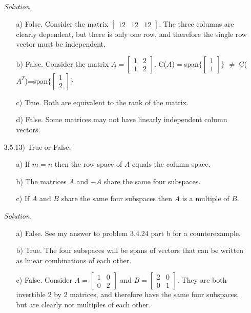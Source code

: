 \documentclass[12pt]{article}
\begin{document}
\begin{itemize}
\textit{Solution.}
\begin{itemize}
\item[a)] False. Consider the matrix $\left[\begin{array}{ccc} 12 & 12 & 12 \end{array}\right]$. The three columns are clearly dependent, but there is only one row, and therefore the single row vector must be independent.
\item[b)] False. Consider the matrix $A=\left[\begin{array}{cc} 1 & 2 \\ 1 & 2\end{array}\right]$. C($A$)$=$span$\{\left[\begin{array}{c} 1 \\ 1\end{array}\right]\}$ $\neq$ 
C($A^T$)=span$\{\left[\begin{array}{c} 1 \\ 2\end{array}\right]\}$
\item[c)] True. Both are equivalent to the rank of the matrix.
\item[d)] False. Some matrices may not have linearly independent column vectors.
\end{itemize}

\item[3.5.13)] True or False:
\begin{itemize}
\item[a)] If $m=n$ then the row space of $A$ equals the column space.
\item[b)] The matrices $A$ and $-A$ share the same four subspaces.
\item[c)] If $A$ and $B$ share the same four subspaces then $A$ is a multiple of $B$.
\end{itemize}

\textit{Solution.}
\begin{itemize}
\item[a)] False. See my answer to problem 3.4.24 part b for a counterexample.
\item[b)] True. The four subspaces will be spans of vectors that can be written as linear combinations of each other.
\item[c)] False. Consider $A=\left[\begin{array}{cc} 1 & 0 \\ 0 & 2\end{array}\right]$ and 
$B=\left[\begin{array}{cc} 2 & 0 \\ 0 & 1\end{array}\right]$. They are both invertible 2 by 2 matrices, and therefore have the same four subspaces, but are clearly not multiples of each other.
\end{itemize}


\end{itemize}
\end{document}
